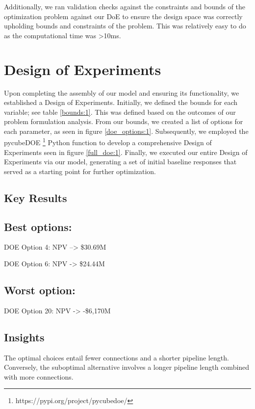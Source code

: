 \documentclass[balance,upint,subscriptcorrection,varvw,mathalfa=cal=boondoxo,spanish,french,vietnamese,russian,greek,pdf-a,colorlinks]{asmeconf}
\begin{document}

Additionally, we ran validation checks against the constraints and bounds of the optimization problem against our DoE to ensure the design space was correctly upholding bounds and constraints of the problem. This was relatively easy to do as the computational time was >10ms.


\section{Design of Experiments}

Upon completing the assembly of our model and ensuring its functionality, we established a Design of Experiments. Initially, we defined the bounds for each variable; see table \ref{bounds:1}. This was defined based on the outcomes of our problem formulation analysis. From our bounds, we created a list of options for each parameter, as seen in figure \ref{doe_options:1}. Subsequently, we employed the pycubeDOE \footnote{https://pypi.org/project/pycubedoe/} Python function to develop a comprehensive Design of Experiments seen in figure \ref{full_doe:1}. Finally, we executed our entire Design of Experiments via our model, generating a set of initial baseline responses that served as a starting point for further optimization.

\subsection{Key Results}
\subsection*{Best options:}
DOE Option 4: NPV –> \$30.69M

DOE Option 6: NPV -> \$24.44M

\subsection*{Worst option:}
DOE Option 20: NPV -> -\$6,170M

\subsection{Insights}
The optimal choices entail fewer connections and a shorter pipeline length. Conversely, the suboptimal alternative involves a longer pipeline length combined with more connections.
\end{document}
